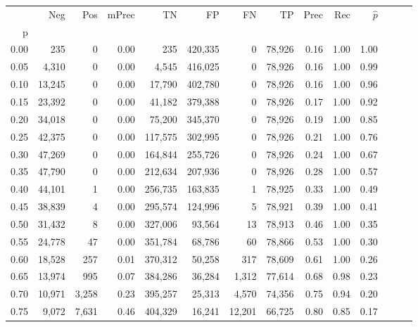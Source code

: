 \begin{tabular}{rrrrrrrrrrrrrr}
\toprule
{} &     Neg &     Pos & mPrec &       TN &       FP &      FN &      TP &  Prec &   Rec & $\hat{p}$ \\
p    &         &         &       &          &          &         &         &       &       &           \\
\midrule
0.00 &     235 &       0 &  0.00 &      235 &  420,335 &       0 &  78,926 &  0.16 &  1.00 &      1.00 \\
0.05 &   4,310 &       0 &  0.00 &    4,545 &  416,025 &       0 &  78,926 &  0.16 &  1.00 &      0.99 \\
0.10 &  13,245 &       0 &  0.00 &   17,790 &  402,780 &       0 &  78,926 &  0.16 &  1.00 &      0.96 \\
0.15 &  23,392 &       0 &  0.00 &   41,182 &  379,388 &       0 &  78,926 &  0.17 &  1.00 &      0.92 \\
0.20 &  34,018 &       0 &  0.00 &   75,200 &  345,370 &       0 &  78,926 &  0.19 &  1.00 &      0.85 \\
0.25 &  42,375 &       0 &  0.00 &  117,575 &  302,995 &       0 &  78,926 &  0.21 &  1.00 &      0.76 \\
0.30 &  47,269 &       0 &  0.00 &  164,844 &  255,726 &       0 &  78,926 &  0.24 &  1.00 &      0.67 \\
0.35 &  47,790 &       0 &  0.00 &  212,634 &  207,936 &       0 &  78,926 &  0.28 &  1.00 &      0.57 \\
0.40 &  44,101 &       1 &  0.00 &  256,735 &  163,835 &       1 &  78,925 &  0.33 &  1.00 &      0.49 \\
0.45 &  38,839 &       4 &  0.00 &  295,574 &  124,996 &       5 &  78,921 &  0.39 &  1.00 &      0.41 \\
0.50 &  31,432 &       8 &  0.00 &  327,006 &   93,564 &      13 &  78,913 &  0.46 &  1.00 &      0.35 \\
0.55 &  24,778 &      47 &  0.00 &  351,784 &   68,786 &      60 &  78,866 &  0.53 &  1.00 &      0.30 \\
0.60 &  18,528 &     257 &  0.01 &  370,312 &   50,258 &     317 &  78,609 &  0.61 &  1.00 &      0.26 \\
0.65 &  13,974 &     995 &  0.07 &  384,286 &   36,284 &   1,312 &  77,614 &  0.68 &  0.98 &      0.23 \\
0.70 &  10,971 &   3,258 &  0.23 &  395,257 &   25,313 &   4,570 &  74,356 &  0.75 &  0.94 &      0.20 \\
0.75 &   9,072 &   7,631 &  0.46 &  404,329 &   16,241 &  12,201 &  66,725 &  0.80 &  0.85 &      0.17 \\

\end{tabular}
